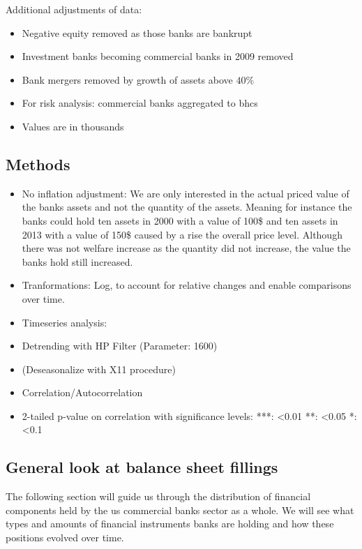 \documentclass[12pt, a4paper]{article} %
\begin{document}
Additional adjustments of data:

\begin{itemize}
\item Negative equity removed as those banks are bankrupt
\item Investment banks becoming commercial banks in 2009 removed
\item Bank mergers removed by growth of assets above $40\%$
\item For risk analysis: commercial banks aggregated to bhcs
\item Values are in thousands
\end{itemize}


\subsection{Methods}



\begin{itemize}
\item No inflation adjustment: We are only interested in the actual priced value of the banks assets and not the quantity of the assets. Meaning for instance the banks could hold ten assets in 2000 with a value of 100\$ and ten assets in 2013 with a value of 150\$ caused by a rise the overall price level. Although there was not welfare increase as the quantity did not increase, the value the banks hold still increased.
\item Tranformations: Log, to account for relative changes and enable comparisons over time.
\item Timeseries analysis:
\item Detrending with HP Filter (Parameter: 1600)
\item (Deseasonalize with X11 procedure)
\item Correlation/Autocorrelation
\item 2-tailed p-value on correlation with significance levels: ***: <0.01
					**: <0.05
					*: <0.1
\end{itemize}



\subsection{General look at balance sheet fillings}

The following section will guide us through the distribution of financial components held by the us commercial banks sector as a whole. We will see what types and amounts of financial instruments banks are holding and how these positions evolved over time. 
\end{document}
